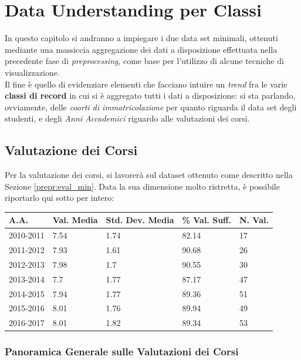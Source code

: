 \chapter{Data Understanding per Classi}
\label{ch:visual}

In questo capitolo si andranno a impiegare i due data set minimali, ottenuti mediante una massiccia aggregazione dei dati a disposizione effettuata nella precedente fase di \textit{preprocessing}, come base per l'utilizzo di alcune tecniche di visualizzazione. \\

Il fine è quello di evidenziare elementi che facciano intuire un \textit{trend} fra le varie \textbf{classi di record} in cui si è aggregato tutti i dati a disposizione: si sta parlando, ovviamente, delle \textit{coorti di immatricolazione} per quanto riguarda il data set degli studenti, e degli \textit{Anni Accademici} riguardo alle valutazioni dei corsi.

\section{Valutazione dei Corsi}

Per la valutazione dei corsi, si lavorerà sul dataset ottenuto come descritto nella Sezione \ref{prepr:eval_min}. Data la sua dimensione molto ristretta, è possibile riportarlo qui sotto per intero:

\begin{table}[]
\begin{tabular}{lllll}
\hline
A.A. & Val. Media & Std. Dev. Media & \% Val. Suff. & N. Val. \\ \hline
2010-2011 & 7.54 & 1.74 & 82.14 & 17 \\
2011-2012 & 7.93 & 1.61 & 90.68 & 26 \\
2012-2013 & 7.98 & 1.7 & 90.55 & 30 \\
2013-2014 & 7.7 & 1.77 & 87.17 & 47 \\
2014-2015 & 7.94 & 1.77 & 89.36 & 51 \\
2015-2016 & 8.01 & 1.76 & 89.94 & 49 \\
2016-2017 & 8.01 & 1.82 & 89.34 & 53 \\ \hline
\end{tabular}
\end{table}

    \subsection{Panoramica Generale sulle Valutazioni dei Corsi}
    \label{visual:eval_gen}

